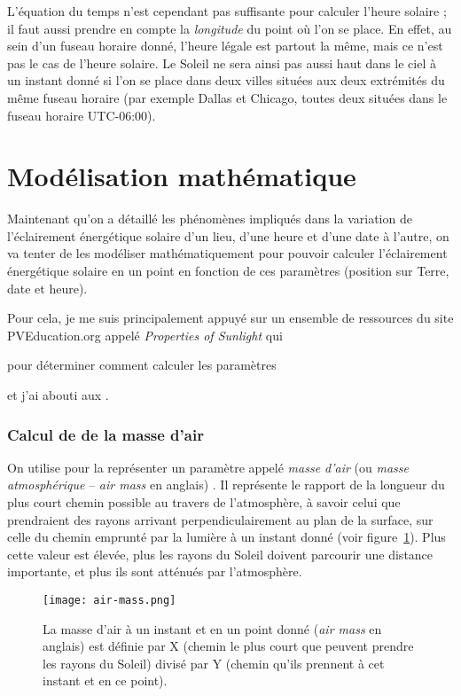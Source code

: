 \documentclass[12pt]{article}
\begin{document}
L'équation du temps n'est cependant pas suffisante pour calculer l'heure solaire ; il faut aussi prendre en compte la \emph{longitude} du point où l'on se place.
En effet, au sein d'un fuseau horaire donné, l'heure légale est partout la même, mais ce n'est pas le cas de l'heure solaire.
Le Soleil ne sera ainsi pas aussi haut dans le ciel à un instant donné si l'on se place dans deux villes situées aux deux extrémités du même fuseau horaire (par exemple Dallas et Chicago, toutes deux situées dans le fuseau horaire UTC-06:00).




\clearpage
\section{Modélisation mathématique}

Maintenant qu'on a détaillé les phénomènes impliqués dans la variation de l'éclairement énergétique solaire d'un lieu, d'une heure et d'une date à l'autre, on va tenter de les modéliser mathématiquement pour pouvoir calculer l'éclairement énergétique solaire en un point en fonction de ces paramètres (position sur Terre, date et heure).

Pour cela, je me suis principalement appuyé sur un ensemble de ressources du site PVEducation.org appelé \emph{Properties of Sunlight} \cite{properties_of_sunlight} qui

pour déterminer comment calculer les paramètres 

et j'ai abouti aux .

\subsubsection{Calcul de de la masse d'air}


On utilise pour la représenter un paramètre appelé \emph{masse d'air} (ou \emph{masse atmosphérique} -- \textit{air mass} en anglais) \cite{air_mass_wiki}.
Il représente le rapport de la longueur du plus court chemin possible au travers de l'atmosphère, à savoir celui que prendraient des rayons arrivant perpendiculairement au plan de la surface, sur celle du chemin emprunté par la lumière à un instant donné (voir figure~\ref{fig:air-mass}).
Plus cette valeur est élevée, plus les rayons du Soleil doivent parcourir une distance importante, et plus ils sont atténués par l'atmosphère.

\begin{figure}[H]
	\centerline{\texttt{[image: air-mass.png]}}
	\caption{La masse d'air à un instant et en un point donné (\textit{air mass} en anglais) est définie par X (chemin le plus court que peuvent prendre les rayons du Soleil) divisé par Y (chemin qu'ils prennent à cet instant et en ce point).} %
	\label{fig:air-mass}
\end{figure}
\end{document}
